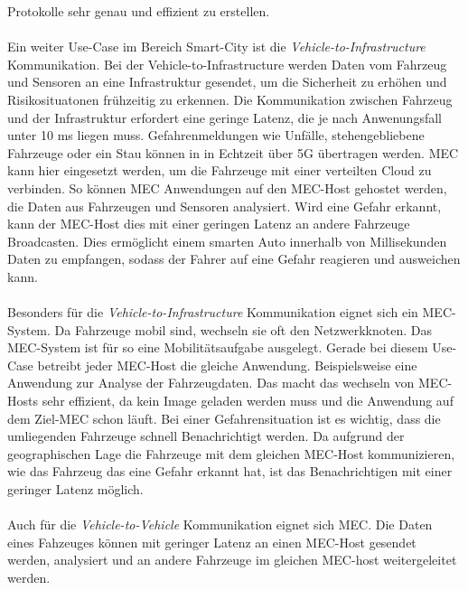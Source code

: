 \documentclass[runningheads]{llncs}
\numberwithin{figure}{section}
\begin{document}
Protokolle sehr genau und effizient zu erstellen.
\\
\\
Ein weiter Use-Case im Bereich Smart-City ist die \textit{Vehicle-to-Infrastructure} Kommunikation.
Bei der Vehicle-to-Infrastructure werden Daten vom Fahrzeug und Sensoren an eine Infrastruktur gesendet, um die Sicherheit zu erhöhen und 
Risikosituatonen frühzeitig zu erkennen. 
Die Kommunikation zwischen Fahrzeug und der Infrastruktur erfordert eine geringe Latenz, 
die je nach Anwenungsfall unter 10 ms liegen muss. 
Gefahrenmeldungen wie Unfälle, stehengebliebene Fahrzeuge oder ein Stau können in in Echtzeit über 5G übertragen werden.
MEC kann hier eingesetzt werden, um die Fahrzeuge mit einer verteilten Cloud zu verbinden. So können MEC Anwendungen auf den MEC-Host 
gehostet werden, die Daten aus Fahrzeugen und Sensoren analysiert. Wird eine Gefahr erkannt, kann der MEC-Host dies mit einer
geringen Latenz an andere Fahrzeuge Broadcasten. 
Dies ermöglicht einem smarten Auto innerhalb von Millisekunden Daten zu empfangen, 
sodass der Fahrer auf eine Gefahr reagieren und ausweichen kann.
\\
\\
Besonders für die \textit{Vehicle-to-Infrastructure} Kommunikation eignet sich ein MEC-System. Da Fahrzeuge mobil sind, wechseln sie
oft den Netzwerkknoten. Das MEC-System ist für so eine Mobilitätsaufgabe ausgelegt. Gerade bei diesem Use-Case betreibt 
jeder MEC-Host die gleiche Anwendung. Beispielsweise eine Anwendung zur Analyse der Fahrzeugdaten. Das macht das wechseln von MEC-Hosts sehr effizient,
da kein Image geladen werden muss und die Anwendung auf dem Ziel-MEC schon läuft. Bei einer Gefahrensituation ist es wichtig, dass die
umliegenden Fahrzeuge schnell Benachrichtigt werden. Da aufgrund der geographischen Lage die Fahrzeuge mit dem gleichen MEC-Host
kommunizieren, wie das Fahrzeug das eine Gefahr erkannt hat, ist das Benachrichtigen mit einer geringer Latenz möglich. 
\\
\\
Auch für die \textit{Vehicle-to-Vehicle} Kommunikation eignet sich MEC. Die Daten eines Fahzeuges können mit geringer Latenz
an einen MEC-Host gesendet werden, analysiert und an andere Fahrzeuge im gleichen MEC-host weitergeleitet werden.
\end{document}
